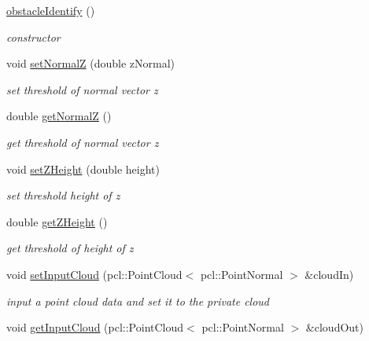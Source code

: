\begin{DoxyCompactItemize}
\item 
\hyperlink{classobstacleIdentify_ae68b52fce2c7c4a1e4e89bc1729d18e1}{obstacle\+Identify} ()\hypertarget{classobstacleIdentify_ae68b52fce2c7c4a1e4e89bc1729d18e1}{}\label{classobstacleIdentify_ae68b52fce2c7c4a1e4e89bc1729d18e1}

\begin{DoxyCompactList}\small\item\em constructor \end{DoxyCompactList}\item 
void \hyperlink{classobstacleIdentify_a37f502bcc8896e1e072ac3aef054f4fb}{set\+NormalZ} (double z\+Normal)
\begin{DoxyCompactList}\small\item\em set threshold of normal vector z \end{DoxyCompactList}\item 
double \hyperlink{classobstacleIdentify_a5011070a62ae25634d900f6d590e64b8}{get\+NormalZ} ()
\begin{DoxyCompactList}\small\item\em get threshold of normal vector z \end{DoxyCompactList}\item 
void \hyperlink{classobstacleIdentify_ac5c0440ff601e6d82d09501a21da5fbc}{set\+Z\+Height} (double height)
\begin{DoxyCompactList}\small\item\em set threshold height of z \end{DoxyCompactList}\item 
double \hyperlink{classobstacleIdentify_a1f33906be0e8353b9e3855757a89563b}{get\+Z\+Height} ()
\begin{DoxyCompactList}\small\item\em get threshold of height of z \end{DoxyCompactList}\item 
void \hyperlink{classobstacleIdentify_acfecaf02b946209c1c60a0c45897a265}{set\+Input\+Cloud} (pcl\+::\+Point\+Cloud$<$ pcl\+::\+Point\+Normal $>$ \&cloud\+In)
\begin{DoxyCompactList}\small\item\em input a point cloud data and set it to the private cloud \end{DoxyCompactList}\item 
void \hyperlink{classobstacleIdentify_a4f8e99317f8791370f63619f711511bf}{get\+Input\+Cloud} (pcl\+::\+Point\+Cloud$<$ pcl\+::\+Point\+Normal $>$ \&cloud\+Out)

\end{DoxyCompactItemize}
